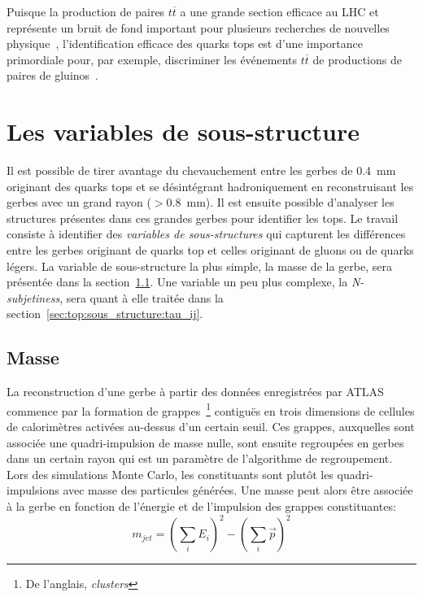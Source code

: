 Puisque la production de paires $t\overline{t}$ a une grande
section efficace au LHC et représente un bruit de fond important pour
plusieurs recherches de nouvelles
physique~\cite{atlas_collaboration_measurement_2015}, l'identification
efficace des quarks tops est d'une importance primordiale pour, par
exemple, discriminer les événements $t\overline{t}$ de productions de
paires de gluinos~\cite{ATLAS-CONF-2015-067}.

\section{Les variables de sous-structure}
\label{sec:top:sous_structure}

Il est possible de tirer avantage du chevauchement entre les gerbes de
0.4~mm originant des quarks tops et se désintégrant hadroniquement en
reconstruisant les gerbes avec un grand rayon ($>0.8$~mm). Il est
ensuite possible d'analyser les structures présentes dans ces grandes
gerbes pour identifier les tops. Le travail consiste à identifier des
\emph{variables de sous-structures} qui capturent les différences
entre les gerbes originant de quarks top et celles originant de gluons
ou de quarks légers. La variable de sous-structure la plus simple, la
masse de la gerbe, sera présentée dans la
section~\ref{sec:top:sous_structure:masse}. Une variable un peu plus
complexe, la \emph{N-subjetiness}, sera quant à elle traitée dans la
section~\ref{sec:top:sous_structure:tau_ij}.

\subsection{Masse}
\label{sec:top:sous_structure:masse}

La reconstruction d'une gerbe à partir des données enregistrées par
ATLAS commence par la formation de grappes~\footnote{De l'anglais,
  \emph{clusters}} contiguës en trois dimensions de cellules de
calorimètres activées au-dessus d'un certain seuil. Ces grappes,
auxquelles sont associée une quadri-impulsion de masse nulle, sont
ensuite regroupées en gerbes dans un certain rayon qui est un
paramètre de l'algorithme de regroupement. Lors des simulations Monte
Carlo, les constituants sont plutôt les quadri-impulsions avec masse des
particules générées. Une masse peut alors être associée à la gerbe en
fonction de l'énergie et de l'impulsion des grappes constituantes:
\begin{equation}
  m_{jet} = \left(\sum_iE_i\right)^2 - \left(\sum_i\overrightarrow{p}\right)^2
\end{equation}

